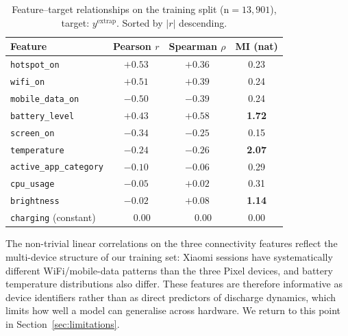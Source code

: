 \documentclass[conference]{IEEEtran}
\begin{document}
\begin{table}[t]
\caption{Feature--target relationships on the training split
(n${=}13{,}901$), target: $y^{\text{extrap}}$. Sorted by $|r|$ descending.}
\label{tab:datadiag}
\centering
\small
\begin{tabular}{lccc}
\toprule
Feature              & Pearson $r$ & Spearman $\rho$ & MI (nat) \\
\midrule
\texttt{hotspot\_on}            & $+0.53$ & $+0.36$ & 0.23 \\
\texttt{wifi\_on}               & $+0.51$ & $+0.39$ & 0.24 \\
\texttt{mobile\_data\_on}       & $-0.50$ & $-0.39$ & 0.24 \\
\texttt{battery\_level}         & $+0.43$ & $+0.58$ & \textbf{1.72} \\
\texttt{screen\_on}             & $-0.34$ & $-0.25$ & 0.15 \\
\texttt{temperature}            & $-0.24$ & $-0.26$ & \textbf{2.07} \\
\texttt{active\_app\_category}  & $-0.10$ & $-0.06$ & 0.29 \\
\texttt{cpu\_usage}             & $-0.05$ & $+0.02$ & 0.31 \\
\texttt{brightness}             & $-0.02$ & $+0.08$ & \textbf{1.14} \\
\texttt{charging} (constant)    & $\phantom{+}0.00$ & $\phantom{+}0.00$ & 0.00 \\
\bottomrule
\end{tabular}
\end{table}

The non-trivial linear correlations on the three connectivity features
reflect the multi-device structure of our training set: Xiaomi sessions
have systematically different WiFi/mobile-data patterns than the three
Pixel devices, and battery temperature distributions also differ. These
features are therefore informative as device identifiers rather than as
direct predictors of discharge dynamics, which limits how well a model
can generalise across hardware. We return to this point in
Section~\ref{sec:limitations}.
\end{document}
